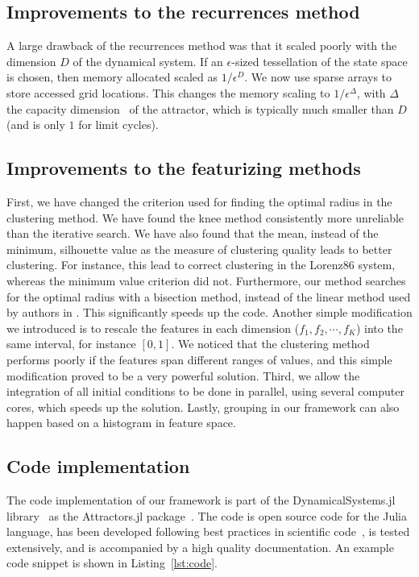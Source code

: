 \documentclass[%
 aip,
 amsmath,amssymb,
 reprint,%
]{revtex4-1}
\begin{document}
\subsection{Improvements to the recurrences method}

A large drawback of the recurrences method was that it scaled poorly with the dimension $D$ of the dynamical system. If an $\epsilon$-sized tessellation of the state space is chosen, then memory allocated scaled as $1/\epsilon^D$. We now use sparse arrays to store accessed grid locations. This changes the memory scaling to $1/\epsilon^\Delta$, with $\Delta$ the capacity dimension~\cite{DatserisBook} of the attractor, which is typically much smaller than $D$ (and is only $1$ for limit cycles).

\subsection{Improvements to the featurizing methods}
First, we have changed the criterion used for finding the optimal radius in the clustering method. We have found the knee method consistently more unreliable than the iterative search. We have also found that the mean, instead of the minimum, silhouette value as the measure of clustering quality leads to better clustering. For instance, this lead to correct clustering in the Lorenz86 system, whereas the minimum value criterion did not. Furthermore, our method searches for the optimal radius with a bisection method, instead of the linear method used by authors in \cite{Stender2021}. This significantly speeds up the code. 
Another simple modification we introduced is to rescale the features in each dimension ($f_1, f_2, \cdots, f_K$) into the same interval, for instance $[0,1]$. We noticed that the clustering method performs poorly if the features span different ranges of values, and this simple modification proved to be a very powerful solution.
Third, we allow the integration of all initial conditions to be done in parallel, using several computer cores, which speeds up the solution.
Lastly, grouping in our framework can also happen based on a histogram in feature space.

\subsection{Code implementation}

The code implementation of our framework is part of the DynamicalSystems.jl library~\cite{DynamicalSystems.jl} as the Attractors.jl package~\cite{Attractors.jl}. The code is open source code for the Julia language, has been developed following best practices in scientific code~\cite{goodscientificcode}, is tested extensively, and is accompanied by a high quality documentation. An example code snippet is shown in Listing~\ref{lst:code}.
\end{document}
